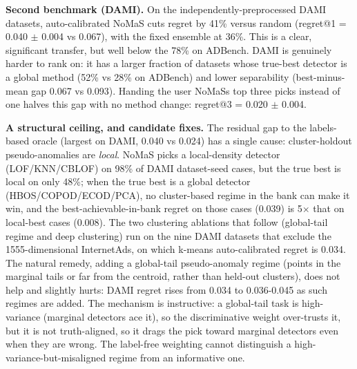 \documentclass[3p,twocolumn]{elsarticle}
\begin{document}
\textbf{Second benchmark (DAMI).} On the independently-preprocessed DAMI datasets, auto-calibrated NoMaS cuts regret by 41\% versus random (regret@1 = 0.040 $\pm$ 0.004 vs 0.067), with the fixed ensemble at 36\%. This is a clear, significant transfer, but well below the 78\% on ADBench. DAMI is genuinely harder to rank on: it has a larger fraction of datasets whose true-best detector is a global method (52\% vs 28\% on ADBench) and lower separability (best-minus-mean gap 0.067 vs 0.093). Handing the user NoMaS\textquotesingle s top three picks instead of one halves this gap with no method change: regret@3 = 0.020 $\pm$ 0.004.

\textbf{A structural ceiling, and candidate fixes.} The residual gap to the labels-based oracle (largest on DAMI, 0.040 vs 0.024) has a single cause: cluster-holdout pseudo-anomalies are \emph{local}. NoMaS picks a local-density detector (LOF/KNN/CBLOF) on 98\% of DAMI dataset-seed cases, but the true best is local on only 48\%; when the true best is a global detector (HBOS/COPOD/ECOD/PCA), no cluster-based regime in the bank can make it win, and the best-achievable-in-bank regret on those cases (0.039) is 5$\times$ that on local-best cases (0.008). The two clustering ablations that follow (global-tail regime and deep clustering) run on the nine DAMI datasets that exclude the 1555-dimensional InternetAds, on which k-means auto-calibrated regret is 0.034. The natural remedy, adding a global-tail pseudo-anomaly regime (points in the marginal tails or far from the centroid, rather than held-out clusters), does not help and slightly hurts: DAMI regret rises from 0.034 to 0.036-0.045 as such regimes are added. The mechanism is instructive: a global-tail task is high-variance (marginal detectors ace it), so the discriminative weight over-trusts it, but it is not truth-aligned, so it drags the pick toward marginal detectors even when they are wrong. The label-free weighting cannot distinguish a high-variance-but-misaligned regime from an informative one.
\end{document}
